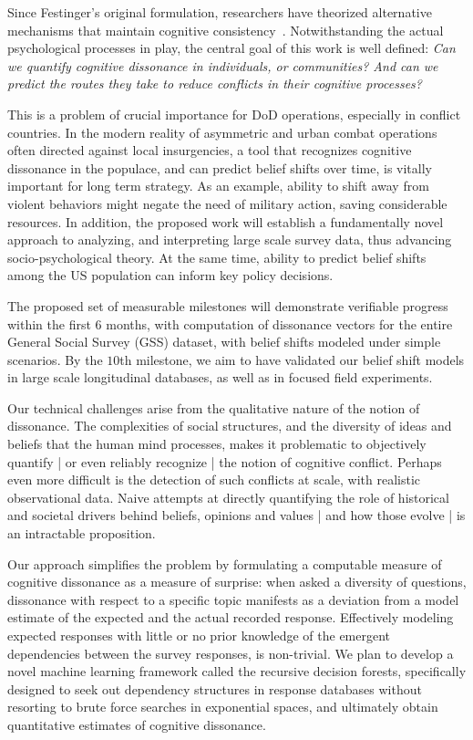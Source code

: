 \documentclass[onecolumn, compsoc,11pt]{IEEEtran}
\begin{document}
Since Festinger's original formulation, researchers have theorized alternative mechanisms that maintain cognitive consistency~\cite{ARONSON19691,zanna74,COOPER1984229}. Notwithstanding the actual psychological processes in play, the central goal of this work is
well defined: \textit{Can we quantify cognitive dissonance in individuals, or communities? And can we predict the routes they take to reduce conflicts in their cognitive processes?}

This is a problem of crucial importance for DoD operations, especially in conflict countries. In the modern reality of asymmetric and urban combat operations often directed against  local insurgencies, a tool that recognizes cognitive dissonance in the populace, and can predict belief shifts over time, is vitally important for long term strategy. As an example, ability to shift away from  violent behaviors might negate the need of military action, saving considerable resources. In addition, the proposed work will establish a fundamentally novel approach to analyzing, and interpreting large scale survey data, thus advancing socio-psychological theory. At the same time, ability to predict belief shifts among the US population can inform key  policy decisions.

The proposed set of measurable milestones will demonstrate verifiable progress within the first 6 months, with computation of dissonance vectors for the entire General Social Survey (GSS) dataset, with belief shifts modeled under simple scenarios. By the $10$th milestone, we aim to have  validated our belief shift models  in large scale longitudinal  databases, as well as
in focused field experiments.

Our technical challenges  arise  from the qualitative nature of the notion of dissonance. The  complexities of social structures, and the diversity of ideas and beliefs that the human mind processes,  makes it  problematic to objectively  quantify | or even reliably recognize |  the notion of cognitive conflict. Perhaps even more difficult is the detection of  such conflicts at scale, with realistic observational data.  Naive attempts at directly quantifying the role of  historical and societal  drivers behind  beliefs, opinions and values | and how those  evolve |  is an intractable proposition.

Our approach simplifies the problem by formulating  a computable measure of cognitive dissonance as a measure of surprise: when asked a diversity of questions, dissonance with respect to a specific topic manifests as a deviation from a model estimate of the expected and the actual recorded response. Effectively modeling  expected responses with little or no prior knowledge of the emergent dependencies between the survey responses, is  non-trivial. We plan to develop a novel machine learning  framework called the recursive decision forests,  specifically designed to seek out dependency structures in response databases without resorting to brute force searches in exponential spaces, and ultimately obtain quantitative estimates of cognitive dissonance.
\end{document}
